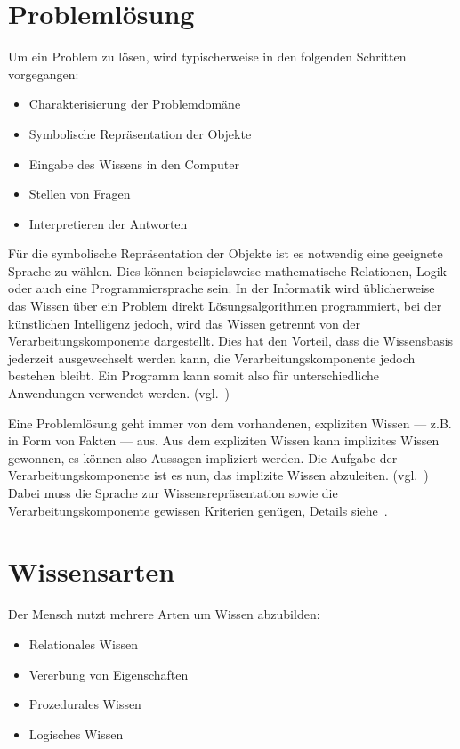 \newpage

\section{Problemlösung}
\label{sec:experten_systeme_problemloesung}
Um ein Problem zu lösen, wird typischerweise in den folgenden Schritten vorgegangen:
\begin{itemize}
    \item Charakterisierung der Problemdomäne
    \item Symbolische Repräsentation der Objekte
    \item Eingabe des Wissens in den Computer
    \item Stellen von Fragen
    \item Interpretieren der Antworten
\end{itemize}

Für die symbolische Repräsentation der Objekte ist es notwendig eine geeignete Sprache zu wählen. Dies können beispielsweise mathematische Relationen, Logik oder auch eine Programmiersprache sein. In der Informatik wird üblicherweise das Wissen über ein Problem direkt Lösungsalgorithmen programmiert, bei der künstlichen Intelligenz jedoch, wird das Wissen getrennt von der Verarbeitungskomponente dargestellt. Dies hat den Vorteil, dass die Wissensbasis jederzeit ausgewechselt werden kann, die Verarbeitungskomponente jedoch bestehen bleibt. Ein Programm kann somit also für unterschiedliche Anwendungen verwendet werden. (vgl.~\cite[S. 28 - 30]{laemmel})

Eine Problemlösung geht immer von dem vorhandenen, expliziten Wissen --- z.B. in Form von Fakten --- aus. Aus dem expliziten Wissen kann implizites Wissen gewonnen, es können also Aussagen impliziert werden. Die Aufgabe der Verarbeitungskomponente ist es nun, das implizite Wissen abzuleiten. (vgl.~\cite[S. 30 - 31]{laemmel}) Dabei muss die Sprache zur Wissensrepräsentation sowie die Verarbeitungskomponente gewissen Kriterien genügen, Details siehe~\cite[S. 31]{laemmel}.

\section{Wissensarten}
\label{sec:experten_systeme_wissensarten}
Der Mensch nutzt mehrere Arten um Wissen abzubilden:
\begin{itemize}
    \item Relationales Wissen
    \item Vererbung von Eigenschaften
    \item Prozedurales Wissen
    \item Logisches Wissen
\end{itemize}
\label{itm:wissensarten}

